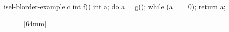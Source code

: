 \begin{filecontents*}{isel-blorder-example.c}
int f() {
  int a;
  do {
    a = g();
  } while (a == 0);
  return a;
}
\end{filecontents*}

\begin{figure}
  \centering%
                {}%
  \hspace{5mm}%
                [64mm]%
                {}%

  \vspace{\baselineskip}


\end{figure}
